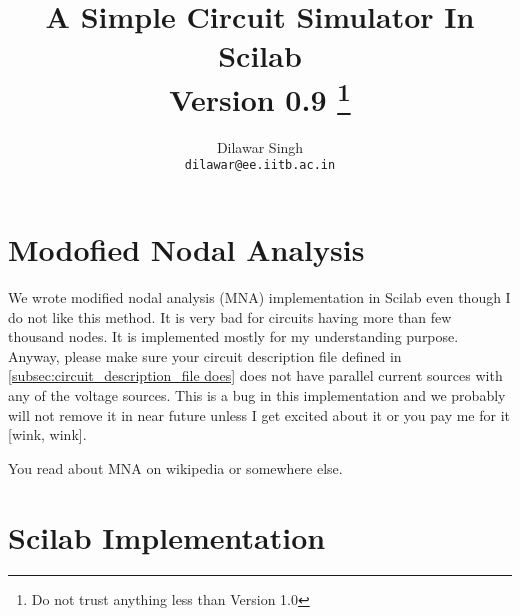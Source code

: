 \documentclass[a4paper,10pt]{article}
\title{A Simple Circuit Simulator In Scilab\\
\small{Version 0.9} \footnote{Do not trust anything less than Version 1.0}\\
}
\author{Dilawar Singh\\ \texttt{dilawar@ee.iitb.ac.in}}
\begin{document}
\maketitle
\section{Modofied Nodal Analysis}
We wrote modified nodal analysis (MNA) implementation in Scilab even though I
do not like this method. It is very bad for circuits having more than few
 thousand nodes. It is implemented mostly for my understanding
purpose. Anyway, please make sure your circuit description file
defined in \ref{subsec:circuit_description_file does} does not have parallel
current sources with any of the voltage sources. This is a bug in this
implementation and we probably will not remove it in near future unless I
get excited about it or you pay me for it [wink, wink].
\par
You read about MNA on wikipedia or somewhere else.
\section{Scilab Implementation}
\end{document}
